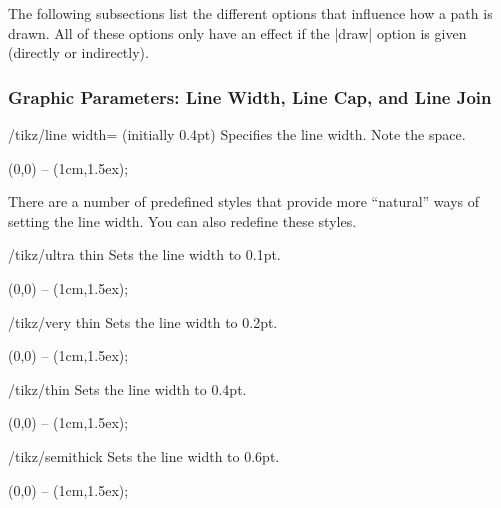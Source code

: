 The following subsections list the different options that influence
how a path is drawn. All of these options only have an effect if the
|draw| option is given (directly or indirectly).

\subsubsection{Graphic Parameters: Line Width, Line Cap, and Line Join}

\label{section-cap-joins}

\begin{key}{/tikz/line width= (initially 0.4pt)}
  Specifies the line width. Note the space.

\begin{codeexample}[]
  \tikz \draw[line width=5pt] (0,0) -- (1cm,1.5ex);
\end{codeexample}
\end{key}

There are a number of predefined styles that provide more ``natural''
ways of setting the line width. You can also redefine these
styles.

\begin{stylekey}{/tikz/ultra thin}
  Sets the line width to 0.1pt.
\begin{codeexample}[]
  \tikz {} (0,0) -- (1cm,1.5ex);
\end{codeexample}
\end{stylekey}

\begin{stylekey}{/tikz/very thin}
  Sets the line width to 0.2pt.
\begin{codeexample}[]
  \tikz {} (0,0) -- (1cm,1.5ex);
\end{codeexample}
\end{stylekey}

\begin{stylekey}{/tikz/thin}
  Sets the line width to 0.4pt.
\begin{codeexample}[]
  \tikz \draw[thin] (0,0) -- (1cm,1.5ex);
\end{codeexample}
\end{stylekey}

\begin{stylekey}{/tikz/semithick}
  Sets the line width to 0.6pt.
\begin{codeexample}[]
  \tikz \draw[semithick] (0,0) -- (1cm,1.5ex);
\end{codeexample}
\end{stylekey}

